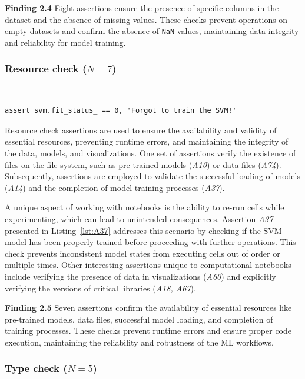 \documentclass[smallextended]{svjour3}       %
\newcommand{\highlight}[1]{\begin{framed}%
  \noindent#1
\end{framed}}
\begin{document}
\highlight{\textbf{Finding 2.4} Eight assertions ensure the presence of specific columns in the dataset and the absence of missing values. These checks prevent operations on empty datasets and confirm the absence of \texttt{NaN} values, maintaining data integrity and reliability for model training.}

\subsubsection{Resource check ($N = 7$)}~\label{sec:result-rq2-resource-check}

\begin{lstlisting}[caption={Assertion \emph{A37} used to ensure that an ML model has not reached an inconsistent state due to out-of-order or re-execution of code cells.}, label={lst:A37}]
assert svm.fit_status_ == 0, 'Forgot to train the SVM!'
\end{lstlisting}

Resource check assertions are used to ensure the availability and validity of essential resources, preventing runtime errors, and maintaining the integrity of the data, models, and visualizations. One set of assertions verify the existence of files on the file system, such as pre-trained models (\emph{A10}) or data files (\emph{A74}). Subsequently, assertions are employed to validate the successful loading of models (\emph{A14}) and the completion of model training processes (\emph{A37}).

A unique aspect of working with notebooks is the ability to re-run cells while experimenting, which can lead to unintended consequences. Assertion \emph{A37} presented in Listing~\ref{lst:A37} addresses this scenario by checking if the SVM model has been properly trained before proceeding with further operations. This check prevents inconsistent model states from executing cells out of order or multiple times. Other interesting assertions unique to computational notebooks include verifying the presence of data in visualizations (\emph{A60}) and explicitly verifying the versions of critical libraries (\emph{A18, A67}).

\highlight{\textbf{Finding 2.5} Seven assertions confirm the availability of essential resources like pre-trained models, data files, successful model loading, and completion of training processes. These checks prevent runtime errors and ensure proper code execution, maintaining the reliability and robustness of the ML workflows.}

\subsubsection{Type check ($N = 5$)}
\end{document}
